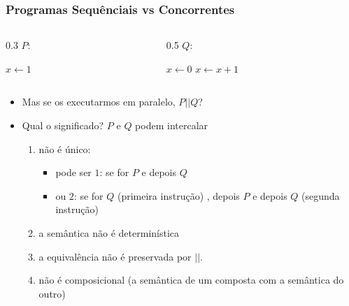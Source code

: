 \documentclass[aspectratio=169]{beamer}
\begin{document}
\begin{frame}
  \frametitle{Programas Sequênciais vs Concorrentes}
\begin{columns}
  \begin{column}[t]{0.3\textwidth}
$P:$
\begin{algorithmic}
\State $x\gets 1$
\end{algorithmic}
\end{column} 
\begin{column}[t]{0.5\textwidth}
$Q:$
\begin{algorithmic}
\State $x\gets 0$
\State $x\gets x+1$
\end{algorithmic} 
\end{column}
\end{columns}

\begin{itemize}[<+->]
  \item Mas se os executarmos em paralelo, $P || Q$?
\item Qual o significado? $P$ e $Q$ podem intercalar
\begin{enumerate}
  \item não é único: 
\begin{itemize}
\item pode ser  $1$: se for $P$ e depois $Q$
\item  ou $2$: se for $Q$ (primeira instrução) , depois $P$ e depois $Q$ (segunda instrução)
\end{itemize}
\item a semântica não é determinística
\item a equivalência não é preservada por $||$.
\item não é composicional (a semântica de um composta com a semântica do outro)
\end{enumerate}
\end{itemize}
\end{frame}
\end{document}
